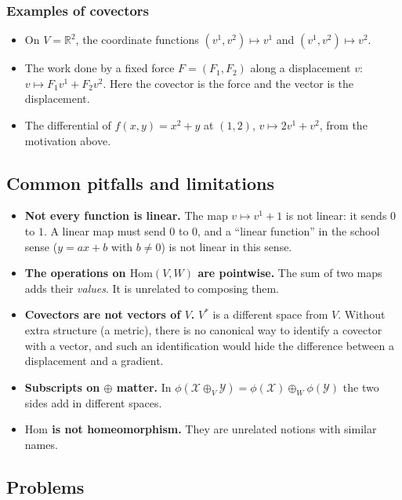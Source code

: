 \documentclass[11pt]{article}
\newcommand{\dual}{V^{*}}
\begin{document}
\subsubsection*{Examples of covectors}
\begin{itemize}
  \item On $V=\mathbb R^2$, the coordinate functions $(v^1,v^2)\mapsto v^1$ and $(v^1,v^2)\mapsto v^2$.
  \item The work done by a fixed force $F=(F_1,F_2)$ along a displacement $v$: $v\mapsto F_1v^1+F_2v^2$. Here the covector is the force and the vector is the displacement.
  \item The differential of $f(x,y)=x^2+y$ at $(1,2)$, $v\mapsto 2v^1+v^2$, from the motivation above.
\end{itemize}

\subsection*{Common pitfalls and limitations}

\begin{itemize}
  \item \textbf{Not every function is linear.} The map $v\mapsto v^1+1$ is not linear: it sends $0$ to $1$. A linear map must send $0$ to $0$, and a ``linear function'' in the school sense ($y=ax+b$ with $b\ne0$) is not linear in this sense.
  \item \textbf{The operations on $\mathrm{Hom}(V,W)$ are pointwise.} The sum of two maps adds their \emph{values}. It is unrelated to composing them.
  \item \textbf{Covectors are not vectors of $V$.} $\dual$ is a different space from $V$. Without extra structure (a metric), there is no canonical way to identify a covector with a vector, and such an identification would hide the difference between a displacement and a gradient.
  \item \textbf{Subscripts on $\oplus$ matter.} In $\phi(\mathcal X\oplus_V\mathcal Y)=\phi(\mathcal X)\oplus_W\phi(\mathcal Y)$ the two sides add in different spaces.
  \item \textbf{$\mathrm{Hom}$ is not homeomorphism.} They are unrelated notions with similar names.
\end{itemize}

\subsection*{Problems}
\end{document}
